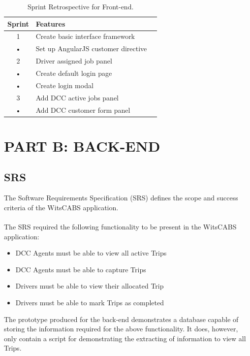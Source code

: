\documentclass[12pt]{article}
\begin{document}
\begin{table}[htb]
    \caption{Sprint Retrospective for Front-end.\label{tab:fonts}}
    \begin{center} 
\begin{tabular}{|c|l|c|}
\hline 
Sprint & Features\\ 
\hline 
 1 & Create basic interface framework\\ 
• & Set up AngularJS customer directive\\

\hline 
 2 & Driver assigned job panel\\
• & Create default login page\\
• & Create login modal\\
\hline 
 3 & Add DCC active jobs panel \\ 
 • & Add DCC customer form panel\\
 

\hline
\end{tabular} 
\end{center}
\end{table}



\newpage
\section{PART B: BACK-END}
\subsection{SRS}
The Software Requirements Specification (SRS) defines the scope and success criteria of the WitsCABS application. \\ \\

The SRS required the following functionality to be present in the WitsCABS application:
\begin{itemize}
\item DCC Agents must be able to view all active Trips
\item DCC Agents must be able to capture Trips
\item Drivers must be able to view their allocated Trip
\item Drivers must be able to mark Trips as completed
\end{itemize}

The prototype produced for the back-end demonstrates a database capable of storing the information required for the above functionality. It does, however, only contain a script for demonstrating the extracting of information to view all Trips. \\
\end{document}
